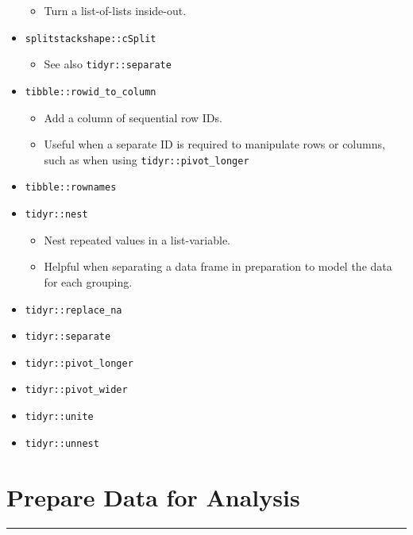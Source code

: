 \documentclass[
]{book}
\providecommand{\tightlist}{%
  \setlength{\itemsep}{0pt}\setlength{\parskip}{0pt}}
\begin{document}
\begin{itemize}
  \begin{itemize}
  \tightlist
  \item
    Turn a list-of-lists inside-out.
  \end{itemize}
\item
  \texttt{splitstackshape::cSplit}

  \begin{itemize}
  \tightlist
  \item
    See also \texttt{tidyr::separate}
  \end{itemize}
\item
  \texttt{tibble::rowid\_to\_column}

  \begin{itemize}
  \tightlist
  \item
    Add a column of sequential row IDs.
  \item
    Useful when a separate ID is required to manipulate rows or columns, such as when using \texttt{tidyr::pivot\_longer}
  \end{itemize}
\item
  \texttt{tibble::rownames}
\item
  \texttt{tidyr::nest}

  \begin{itemize}
  \tightlist
  \item
    Nest repeated values in a list-variable.
  \item
    Helpful when separating a data frame in preparation to model the data for each grouping.
  \end{itemize}
\item
  \texttt{tidyr::replace\_na}
\item
  \texttt{tidyr::separate}
\item
  \texttt{tidyr::pivot\_longer}
\item
  \texttt{tidyr::pivot\_wider}
\item
  \texttt{tidyr::unite}
\item
  \texttt{tidyr::unnest}
\end{itemize}

\hypertarget{prepare-data-for-analysis}{%
\section{Prepare Data for Analysis}\label{prepare-data-for-analysis}}

\begin{center}\rule{0.5\linewidth}{0.5pt}\end{center}
\end{document}
